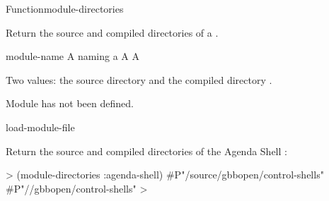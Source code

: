 \documentclass[10pt,twoside,english,pdftex]{article}
\begin{document}
\begin{functiondoc}{Function}{module-directories}{
    \mbox{\returns{} }}
%
%

\fnsyntax 

\fnpurpose Return the source and compiled directories of a .

\fnpackage {}

\fnmodule {}

\fnargs
\begin{args}{module-name}
 A  naming a 
 A 
 A 
\end{args}

\fnreturns Two values: the source directory  and the compiled
directory .

\fnerrors
Module  has not been defined.\\
\relativedircircularity

\begin{alsos}{load-module-file}
\end{alsos}

\fnexample
%
Return the source and compiled directories of the Agenda Shell :
%
\W\supp
\begin{example}
  > (module-directories :agenda-shell)
  #P"/source/gbbopen/control-shells"
  #P"//gbbopen/control-shells"
  >
\end{example} 

\end{functiondoc}

\end{document}
